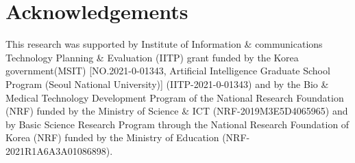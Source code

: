 \documentclass[letterpaper]{article} %
\begin{document}

\section{Acknowledgements}
This research was supported by Institute of Information \& communications Technology Planning \& Evaluation (IITP) grant funded by the Korea government(MSIT) [NO.2021-0-01343, Artificial Intelligence Graduate School Program (Seoul National University)] (IITP-2021-0-01343) 
and by the Bio \& Medical Technology Development Program of the National Research Foundation (NRF) funded by the Ministry of Science \& ICT (NRF-2019M3E5D4065965) 
and by Basic Science Research Program through the National Research Foundation of Korea (NRF) funded by the Ministry of Education (NRF-2021R1A6A3A01086898).



\end{document}

